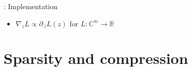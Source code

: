 \documentclass{beamer}
\newcommand{\real}{\mathbb{R}}
\newcommand{\cplx}{\mathbb{C}}
\newcommand{\conj}[1]{\overline{#1}}
\begin{document}
\begin{frame}[c]{\insertsection: Implementation}
\begin{itemize}
    \item $\nabla_z L \propto \partial_{\,\conj{z}} L(z)$ for $L\colon \cplx^m \to \real$
  \end{itemize}

\end{frame}


\section{Sparsity and compression} %
\label{sec:compression}
\end{document}
